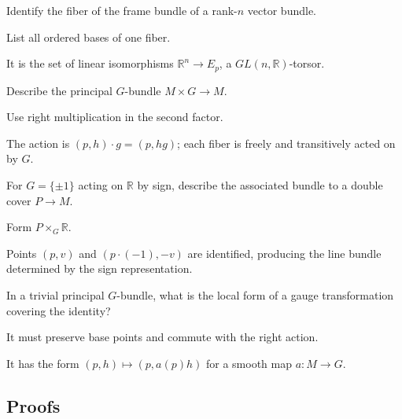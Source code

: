 \begin{exercise}\label{exr:vii08-ped-02}
Identify the fiber of the frame bundle of a rank-\(n\) vector bundle.
\end{exercise}
\begin{hint}
List all ordered bases of one fiber.
\end{hint}
\begin{solution}
It is the set of linear isomorphisms \(\mathbb R^n\to E_p\), a \(GL(n,\mathbb R)\)-torsor.
\end{solution}

\begin{exercise}\label{exr:vii08-ped-03}
Describe the principal \(G\)-bundle \(M\times G\to M\).
\end{exercise}
\begin{hint}
Use right multiplication in the second factor.
\end{hint}
\begin{solution}
The action is \((p,h)\cdot g=(p,hg)\); each fiber is freely and transitively acted on by \(G\).
\end{solution}

\begin{exercise}\label{exr:vii08-ped-04}
For \(G=\{\pm1\}\) acting on \(\mathbb R\) by sign, describe the associated bundle to a double cover \(P\to M\).
\end{exercise}
\begin{hint}
Form \(P\times_G\mathbb R\).
\end{hint}
\begin{solution}
Points \((p,v)\) and \((p\cdot(-1),-v)\) are identified, producing the line bundle determined by the sign representation.
\end{solution}

\begin{exercise}\label{exr:vii08-ped-05}
In a trivial principal \(G\)-bundle, what is the local form of a gauge transformation covering the identity?
\end{exercise}
\begin{hint}
It must preserve base points and commute with the right action.
\end{hint}
\begin{solution}
It has the form \((p,h)\mapsto(p,a(p)h)\) for a smooth map \(a:M\to G\).
\end{solution}

\subsection*{Proofs}

